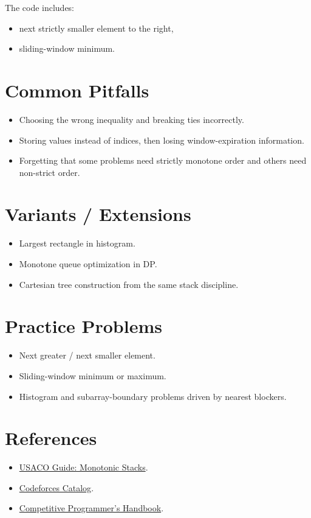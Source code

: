 The code includes:

\begin{itemize}
  \item next strictly smaller element to the right,
  \item sliding-window minimum.
\end{itemize}

\section*{Common Pitfalls}

\begin{itemize}
  \item Choosing the wrong inequality and breaking ties incorrectly.
  \item Storing values instead of indices, then losing window-expiration information.
  \item Forgetting that some problems need strictly monotone order and others need non-strict order.
\end{itemize}

\section*{Variants / Extensions}

\begin{itemize}
  \item Largest rectangle in histogram.
  \item Monotone queue optimization in DP.
  \item Cartesian tree construction from the same stack discipline.
\end{itemize}

\section*{Practice Problems}

\begin{itemize}
  \item Next greater / next smaller element.
  \item Sliding-window minimum or maximum.
  \item Histogram and subarray-boundary problems driven by nearest blockers.
\end{itemize}

\section*{References}

\begin{itemize}
  \item \href{https://usaco.guide/gold/stacks?lang=cpp}{USACO Guide: Monotonic Stacks}.
  \item \href{https://codeforces.com/catalog}{Codeforces Catalog}.
  \item \href{https://usaco.guide/CPH.pdf}{Competitive Programmer's Handbook}.
\end{itemize}
